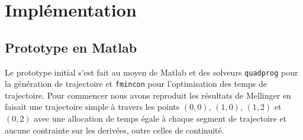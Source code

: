 \section{Implémentation}
\subsection{Prototype en Matlab}

Le prototype initial s'est fait au moyen de Matlab et des solveurs \texttt{quadprog} pour la génération de trajectoire et \texttt{fmincon} pour l'optimisation des temps de trajectoire. Pour commencer nous avons reproduit les résultats de Mellinger en faisait une trajectoire simple à travers les points $(0,0)$, $(1,0)$, $(1,2)$ et $(0,2)$ avec une allocation de temps égale à chaque segment de trajectoire et aucune contrainte sur les derivées, outre celles de continuité.

